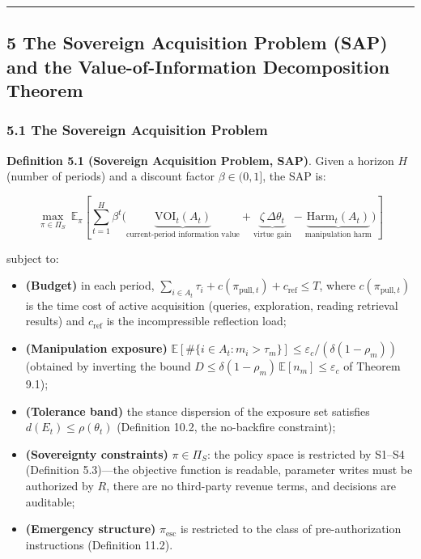 \documentclass[
  11pt]{article}
\providecommand{\tightlist}{%
  \setlength{\itemsep}{0pt}\setlength{\parskip}{0pt}}
\begin{document}
\begin{center}\rule{0.5\linewidth}{0.5pt}\end{center}

\subsection{5 The Sovereign Acquisition Problem (SAP) and the
Value-of-Information Decomposition
Theorem}\label{the-sovereign-acquisition-problem-sap-and-the-value-of-information-decomposition-theorem}

\subsubsection{5.1 The Sovereign Acquisition
Problem}\label{the-sovereign-acquisition-problem}

\textbf{Definition 5.1 (Sovereign Acquisition Problem, SAP)}. Given a
horizon \(H\) (number of periods) and a discount factor
\(\beta \in (0,1]\), the SAP is:

\[\max_{\pi \in \Pi_S}\ \mathbb{E}_\pi\!\left[\sum_{t=1}^{H} \beta^t \Big( \underbrace{\mathrm{VOI}_t(A_t)}_{\text{current-period information value}} + \underbrace{\zeta\, \Delta\theta_t}_{\text{virtue gain}} - \underbrace{\mathrm{Harm}_t(A_t)}_{\text{manipulation harm}} \Big)\right]\]

subject to:

\begin{itemize}
\tightlist
\item
  \textbf{(Budget)} in each period,
  \(\sum_{i \in A_t} \tau_i + c(\pi_{\mathrm{pull},t}) + c_{\mathrm{ref}} \le T\),
  where \(c(\pi_{\mathrm{pull},t})\) is the time cost of active
  acquisition (queries, exploration, reading retrieval results) and
  \(c_{\mathrm{ref}}\) is the incompressible reflection load;
\item
  \textbf{(Manipulation exposure)}
  \(\mathbb{E}[\#\{i \in A_t: m_i > \tau_m\}] \le \varepsilon_c / (\delta(1-\rho_m))\)
  (obtained by inverting the bound
  \(D \le \delta(1-\rho_m)\,\mathbb{E}[n_m] \le \varepsilon_c\) of
  Theorem 9.1);
\item
  \textbf{(Tolerance band)} the stance dispersion of the exposure set
  satisfies \(d(E_t) \le \rho(\theta_t)\) (Definition 10.2, the
  no-backfire constraint);
\item
  \textbf{(Sovereignty constraints)} \(\pi \in \Pi_S\): the policy space
  is restricted by S1--S4 (Definition 5.3)---the objective function is
  readable, parameter writes must be authorized by \(R\), there are no
  third-party revenue terms, and decisions are auditable;
\item
  \textbf{(Emergency structure)} \(\pi_{\mathrm{esc}}\) is restricted to
  the class of pre-authorization instructions (Definition 11.2).
\end{itemize}
\end{document}
